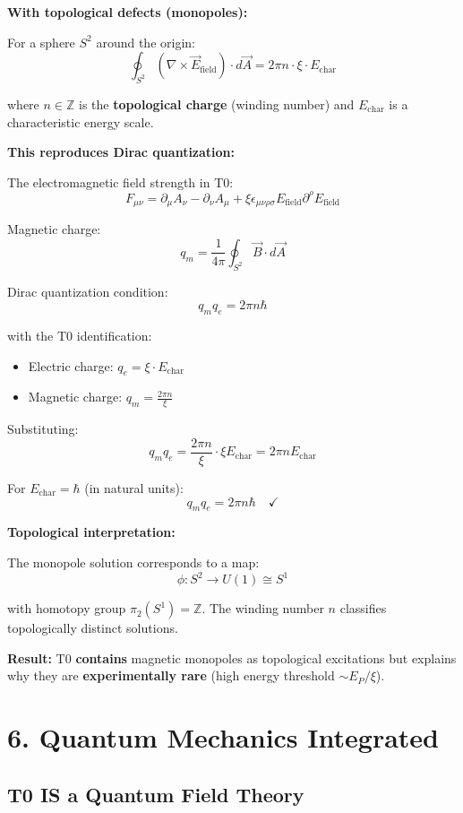 	\textbf{With topological defects (monopoles):}
	
	For a sphere $S^2$ around the origin:
	\[
	\oint_{S^2} (\nabla \times \vec{E}_{\text{field}}) \cdot d\vec{A} = 2\pi n \cdot \xi \cdot E_{\text{char}}
	\]
	
	where $n \in \mathbb{Z}$ is the \textbf{topological charge} (winding number) and $E_{\text{char}}$ is a characteristic energy scale.
	
	\textbf{This reproduces Dirac quantization:}
	
	The electromagnetic field strength in T0:
	\[
	F_{\mu\nu} = \partial_\mu A_\nu - \partial_\nu A_\mu + \xi \epsilon_{\mu\nu\rho\sigma} E_{\text{field}} \partial^\rho E_{\text{field}}
	\]
	
	Magnetic charge:
	\[
	q_m = \frac{1}{4\pi} \oint_{S^2} \vec{B} \cdot d\vec{A}
	\]
	
	Dirac quantization condition:
	\[
	q_m q_e = 2\pi n \hbar
	\]
	
	with the T0 identification:
	\begin{itemize}
		\item Electric charge: $q_e = \xi \cdot E_{\text{char}}$
		\item Magnetic charge: $q_m = \frac{2\pi n}{\xi}$
	\end{itemize}
	
	Substituting:
	\[
	q_m q_e = \frac{2\pi n}{\xi} \cdot \xi E_{\text{char}} = 2\pi n E_{\text{char}}
	\]
	
	For $E_{\text{char}} = \hbar$ (in natural units):
	\[
	\boxed{q_m q_e = 2\pi n \hbar} \quad \checkmark
	\]
	
	\textbf{Topological interpretation:}
	
	The monopole solution corresponds to a map:
	\[
	\phi: S^2 \to U(1) \cong S^1
	\]
	
	with homotopy group $\pi_2(S^1) = \mathbb{Z}$. The winding number $n$ classifies topologically distinct solutions.
	
	\textbf{Result:} T0 \textbf{contains} magnetic monopoles as topological excitations but explains why they are \textbf{experimentally rare} (high energy threshold $\sim E_P/\xi$).
	
	\section*{6. Quantum Mechanics Integrated}
	
	\subsection*{\textbf{T0 IS a Quantum Field Theory}}
	
